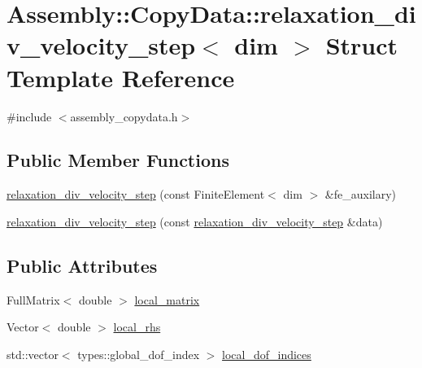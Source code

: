 \hypertarget{struct_assembly_1_1_copy_data_1_1relaxation__div__velocity__step}{}\section{Assembly\+:\+:Copy\+Data\+:\+:relaxation\+\_\+div\+\_\+velocity\+\_\+step$<$ dim $>$ Struct Template Reference}
\label{struct_assembly_1_1_copy_data_1_1relaxation__div__velocity__step}


{\ttfamily \#include $<$assembly\+\_\+copydata.\+h$>$}

\subsection*{Public Member Functions}
\begin{DoxyCompactItemize}
\item 
\hyperlink{struct_assembly_1_1_copy_data_1_1relaxation__div__velocity__step_ad66012c9981c8465b2a1b6d0a0a128ae}{relaxation\+\_\+div\+\_\+velocity\+\_\+step} (const Finite\+Element$<$ dim $>$ \&fe\+\_\+auxilary)
\item 
\hyperlink{struct_assembly_1_1_copy_data_1_1relaxation__div__velocity__step_aec15ab5c3506b52ca6fcb5d9e4774956}{relaxation\+\_\+div\+\_\+velocity\+\_\+step} (const \hyperlink{struct_assembly_1_1_copy_data_1_1relaxation__div__velocity__step}{relaxation\+\_\+div\+\_\+velocity\+\_\+step} \&data)
\end{DoxyCompactItemize}
\subsection*{Public Attributes}
\begin{DoxyCompactItemize}
\item 
Full\+Matrix$<$ double $>$ \hyperlink{struct_assembly_1_1_copy_data_1_1relaxation__div__velocity__step_a9f5b06272cf3ec40da8ad321fefa123f}{local\+\_\+matrix}
\item 
Vector$<$ double $>$ \hyperlink{struct_assembly_1_1_copy_data_1_1relaxation__div__velocity__step_ae75901aacdb5388ace8358c26786fe9c}{local\+\_\+rhs}
\item 
std\+::vector$<$ types\+::global\+\_\+dof\+\_\+index $>$ \hyperlink{struct_assembly_1_1_copy_data_1_1relaxation__div__velocity__step_aa47ca83a0b3c99d4fb949bccbdd2e1cc}{local\+\_\+dof\+\_\+indices}
\end{DoxyCompactItemize}


